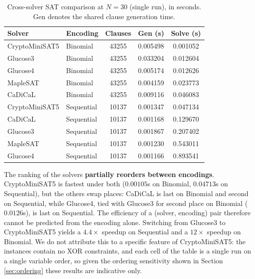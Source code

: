 \documentclass[a4paper,fleqn]{cas-sc}
\begin{document}
\begin{table}[htbp]
    \centering
    \renewcommand{\arraystretch}{1.10}
    \caption{Cross-solver SAT comparison at $N=30$ (single run), in seconds. Gen denotes the shared clause generation time.}
    \label{tab:crosssolver}
    \begin{tabular}{l l S[table-format=6.0] S[table-format=1.5] S[table-format=1.5]}
        \toprule
        \textbf{Solver} & \textbf{Encoding} & \textbf{Clauses} & \textbf{Gen (s)} & \textbf{Solve (s)} \\
        \midrule
        CryptoMiniSAT5 & Binomial   & 43255 & 0.005498 & 0.001052 \\
        Glucose3       & Binomial   & 43255 & 0.033204 & 0.012604 \\
        Glucose4       & Binomial   & 43255 & 0.005174 & 0.012626 \\
        MapleSAT       & Binomial   & 43255 & 0.004159 & 0.023773 \\
        CaDiCaL        & Binomial   & 43255 & 0.009116 & 0.046083 \\
        \midrule
        CryptoMiniSAT5 & Sequential & 10137 & 0.001347 & 0.047134 \\
        CaDiCaL        & Sequential & 10137 & 0.001168 & 0.129670 \\
        Glucose3       & Sequential & 10137 & 0.001867 & 0.207402 \\
        MapleSAT       & Sequential & 10137 & 0.001230 & 0.543011 \\
        Glucose4       & Sequential & 10137 & 0.001166 & 0.893541 \\
        \bottomrule
    \end{tabular}
\end{table}

The ranking of the solvers \textbf{partially reorders between encodings}. CryptoMiniSAT5 is fastest under both ($0.00105$s on Binomial, $0.04713$s on Sequential), but the others swap places: CaDiCaL is last on Binomial and second on Sequential, while Glucose4, tied with Glucose3 for second place on Binomial ($0.0126$s), is last on Sequential. The efficiency of a (solver, encoding) pair therefore cannot be predicted from the encoding alone. Switching from Glucose3 to CryptoMiniSAT5 yields a $4.4\times$ speedup on Sequential and a $12\times$ speedup on Binomial. We do not attribute this to a specific feature of CryptoMiniSAT5: the instances contain no XOR constraints, and each cell of the table is a single run on a single variable order, so given the ordering sensitivity shown in Section \ref{sec:ordering} these results are indicative only.
\end{document}
